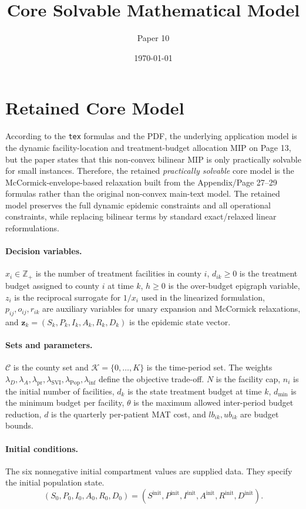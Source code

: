 \documentclass{article}
\title{Core Solvable Mathematical Model}
\author{Paper 10}
\date{\today}
\begin{document}
\maketitle

\section*{Retained Core Model}
According to the \texttt{tex} formulas and the PDF, the underlying application model is the
dynamic facility-location and treatment-budget allocation MIP on Page 13, but the paper states
that this non-convex bilinear MIP is only practically solvable for small instances. Therefore, the
retained \emph{practically solvable} core model is the McCormick-envelope-based relaxation built
from the Appendix/Page 27--29 formulas rather than the original non-convex main-text model. The
retained model preserves the full dynamic epidemic constraints and all operational constraints,
while replacing bilinear terms by standard exact/relaxed linear reformulations.

\paragraph{Decision variables.}
$x_i \in \mathbb Z_+$ is the number of treatment facilities in county $i$,
$d_{ik}\ge 0$ is the treatment budget assigned to county $i$ at time $k$,
$h \ge 0$ is the over-budget epigraph variable,
$z_i$ is the reciprocal surrogate for $1/x_i$ used in the linearized formulation,
$p_{ij},o_{ij},r_{ik}$ are auxiliary variables for unary expansion and McCormick relaxations, and
$\mathbf z_k=(S_k,P_k,I_k,A_k,R_k,D_k)$ is the epidemic state vector.

\paragraph{Sets and parameters.}
$\mathcal C$ is the county set and $\mathcal K=\{0,\dots,K\}$ is the time-period set.
The weights $\lambda_D,\lambda_A,\lambda_{\mathrm{pr}},\lambda_{\mathrm{SVI}},
\lambda_{\mathrm{Pop}},\lambda_{\mathrm{inf}}$ define the objective trade-off.
$N$ is the facility cap, $n_i$ is the initial number of facilities, $d_k$ is the state treatment
budget at time $k$, $d_{\min}$ is the minimum budget per facility, $\theta$ is the maximum
allowed inter-period budget reduction, $d$ is the quarterly per-patient MAT cost, and
$lb_{ik},ub_{ik}$ are budget bounds.

\paragraph{Initial conditions.}
The six nonnegative initial compartment values are supplied data. They specify the initial population state.
\[
(S_0,P_0,I_0,A_0,R_0,D_0)
 = (S^{\mathrm{init}},P^{\mathrm{init}},I^{\mathrm{init}},
A^{\mathrm{init}},R^{\mathrm{init}},D^{\mathrm{init}}).
\]
\end{document}
